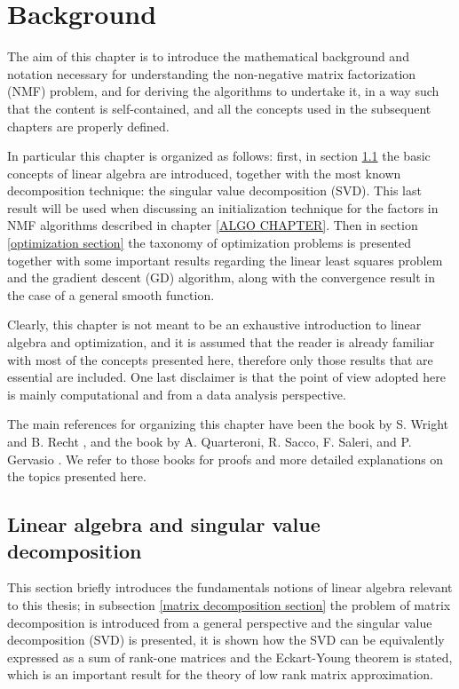 \chapter{Background}\label{BACKGROUND CHAPTER}
The aim of this chapter is to introduce the mathematical background and notation necessary for understanding the non-negative matrix factorization (NMF) problem, and for deriving the algorithms to undertake it, in a 
way such that the content is self-contained, and all the concepts used in the subsequent chapters are properly defined.
\par
In particular this chapter is organized as follows: first, in section \ref{Linear algebra and matrix decomposition section} the basic concepts of linear algebra are introduced, together with the most known decomposition technique: the singular value decomposition (SVD). This last result will be
used when discussing an initialization technique for the factors in NMF algorithms described in chapter \ref{ALGO CHAPTER}.
Then in section \ref{optimization section} the taxonomy of optimization problems is presented together with some important results regarding the linear least squares problem and the gradient descent (GD) algorithm, along with the convergence result in the case of a general smooth function.
\par
Clearly, this chapter is not meant to be an exhaustive introduction to linear algebra and optimization, and it is assumed that the reader is already familiar with most of the concepts presented here, therefore only those results that are essential are included. 
One last disclaimer is that the point of view adopted here is mainly computational and from a data analysis perspective.
\par
The main references for organizing this chapter have been the book by S. Wright and B. Recht \cite{wright2022optimization},
and the book by A. Quarteroni, R. Sacco, F. Saleri, and P. Gervasio \cite{quarteroni2010matematica}. We refer to those books for proofs and more detailed explanations on the topics presented here.
\section{Linear algebra and singular value decomposition}\label{Linear algebra and matrix decomposition section}
This section briefly introduces the fundamentals notions of linear algebra relevant to this thesis;
in subsection \ref{matrix decomposition section} the problem of matrix decomposition is introduced from a general perspective and the singular value decomposition (SVD) is presented, it is shown how the SVD can be equivalently expressed as a sum of rank-one matrices and the Eckart-Young theorem is stated, which is an important result for the theory of low rank matrix approximation.
